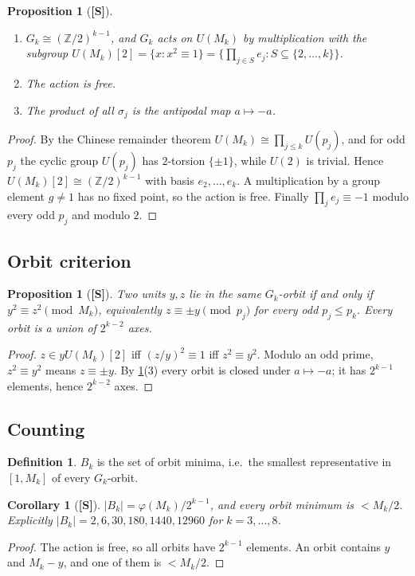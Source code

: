 \documentclass[11pt,a4paper]{article}
\newcommand{\statS}{\textsf{\textbf{[S]}}}
\theoremstyle{plain}
\newtheorem{proposition}[theorem]{Proposition}
\newtheorem{corollary}[theorem]{Corollary}
\theoremstyle{definition}
\newtheorem{definition}[theorem]{Definition}
\theoremstyle{remark}
\newcommand{\Z}{\mathbb{Z}}
\begin{document}
\begin{proposition}[\statS]\label{prop:Gk}
\begin{enumerate}[itemsep=0pt]
\item $G_k\cong(\Z/2)^{k-1}$, and $G_k$ acts on $U(M_k)$ by multiplication
with the subgroup $U(M_k)[2]=\{x:x^2\equiv1\}=\{\prod_{j\in S}e_j:S\subseteq\{2,\dots,k\}\}$.
\item The action is free.
\item The product of all $\sigma_j$ is the antipodal map $a\mapsto-a$.
\end{enumerate}
\end{proposition}
\begin{proof}
By the Chinese remainder theorem $U(M_k)\cong\prod_{j\le k}U(p_j)$, and for
odd $p_j$ the cyclic group $U(p_j)$ has $2$-torsion $\{\pm1\}$, while $U(2)$ is
trivial. Hence $U(M_k)[2]\cong(\Z/2)^{k-1}$ with basis $e_2,\dots,e_k$. A
multiplication by a group element $g\ne1$ has no fixed point, so the action is
free. Finally $\prod_je_j\equiv-1$ modulo every odd $p_j$ and modulo $2$.
\end{proof}

\subsection{Orbit criterion}
\begin{proposition}[\statS]\label{prop:orbitcrit}
Two units $y,z$ lie in the same $G_k$-orbit if and only if
$y^2\equiv z^2\pmod{M_k}$, equivalently $z\equiv\pm y\pmod{p_j}$ for every odd
$p_j\le p_k$. Every orbit is a union of $2^{k-2}$ axes.
\end{proposition}
\begin{proof}
$z\in yU(M_k)[2]$ iff $(z/y)^2\equiv1$ iff $z^2\equiv y^2$. Modulo an odd
prime, $z^2\equiv y^2$ means $z\equiv\pm y$. By \cref{prop:Gk}(3) every orbit
is closed under $a\mapsto-a$; it has $2^{k-1}$ elements, hence $2^{k-2}$ axes.
\end{proof}

\subsection{Counting}
\begin{definition}
$B_k$ is the set of orbit minima, i.e.\ the smallest representative in
$[1,M_k]$ of every $G_k$-orbit.
\end{definition}
\begin{corollary}[\statS]\label{cor:count}
$|B_k|=\varphi(M_k)/2^{k-1}$, and every orbit minimum is $<M_k/2$. Explicitly
$|B_k|=2,6,30,180,1440,12960$ for $k=3,\dots,8$.
\end{corollary}
\begin{proof}
The action is free, so all orbits have $2^{k-1}$ elements. An orbit contains
$y$ and $M_k-y$, and one of them is $<M_k/2$.
\end{proof}
\end{document}
